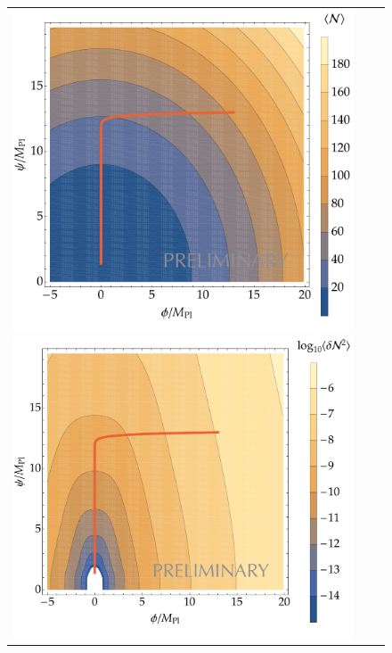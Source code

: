 \documentclass[11pt,a4j,dvipdfmx]{jarticle} 					%
\newcommand{\研究課題名}{\mgfamily\sffamily ストカスティック形式で迫る重力と量子論}
\newcommand{\研究機関名}{\mgfamily\sffamily 名古屋大学}
\newcommand{\研究代表者氏名}{\mgfamily\sffamily 多田祐一郎}
\newcommand{\研究期間の最終元号年度}{34}  %
\begin{document}
\begin{figure}[htbp]
	\centering
	\begin{tabular}{ccc}
		\begin{minipage}{0.25\hsize}
			\centering
			\includegraphics[width=\hsize]{figs/N_conf.pdf}
		\end{minipage}
		\begin{minipage}{0.25\hsize}
			\centering
			\includegraphics[width=\hsize]{figs/dN2_conf.pdf}

\end{minipage}
\end{tabular}
\end{figure}
\end{document}
